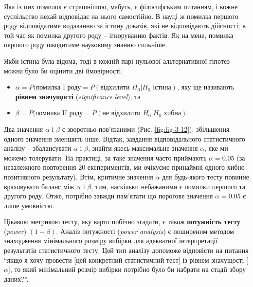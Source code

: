 \documentclass[
  11pt,
]{book}
\begin{document}
Яка із цих помилок є страшнішою, мабуть, є філософським питанням, і кожне суспільство нехай відповідає на нього самостійно. В науці ж помилка першого роду відповідатиме видаванню за істину доказів, які не відповідають дійсності; в той час як помилка другого роду -- ігноруванню фактів. Як на мене, помилка першого роду шкодитиме науковому знанню сильніше.

Якби істина була відома, тоді в кожній парі нульової-альтернативної гіпотез можна було би оцінити дві ймовірності:

\begin{itemize}
\item
  \(\alpha = P(\text{помилка I роду} = P(\text{відхилити } H_0| H_0 \text{ істина})\), яку ще називають \textbf{рівнем значущості} (\emph{significance level}), та
\item
  \(\beta = P(\text{помилка II роду} = P(\text{не відхилити } H_0| H_0 \text{ хибна})\).
\end{itemize}

Два значення \(\alpha\) і \(\beta\) є зворотньо пов'язаними (Рис. \ref{fig:fig-3-12}): збільшення одного значення зменшить інше. Відтак, завдання відповідального статистичного аналізу -- збалансувати \(\alpha\) і \(\beta\), знайти якесь максимальне значення \(\alpha\), яке ми можемо толерувати. На практиці, за таке значення часто приймають \(\alpha = 0.05\) (за незалежного повторення 20 експериментів, ми очікуємо принаймні одного хибно-позитивного результату). Втім, критичне значення \(\alpha\) для будь-якого тесту повинне враховувати баланс між \(\alpha\) і \(\beta\), тим, наскільки небажаними є помилки першого та другого роду. Отже, потрібно завжди пам'ятати що порогове значення \(\alpha = 0.05\) є лише умовністю.

Цікавою метрикою тесту, яку варто побічно згадати, є також \textbf{потужність тесту} (\emph{power}) \((1 - \beta)\). Аналіз потужності (\emph{power analysis}) є поширеним методом знаходження мінімального розміру вибірки для адекватної інтерпретації результатів статистичного тесту. Цей тип аналізу допоможе відповісти на питання ``якщо я хочу провести {[}цей конкретний статистичний тест{]} із рівнем значущості {[}\(\alpha\){]}, то який мінімальний розмір вибірки потрібно було би набрати на стадії збору даних?''.
\end{document}

